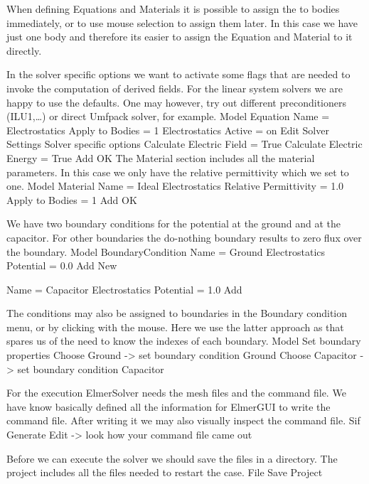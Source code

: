 When defining Equations and Materials it is possible to assign the to bodies immediately, or to use mouse
selection to assign them later. In this case we have just one body and therefore its easier to assign 
the Equation and Material to it directly.

In the solver specific options we want to activate some flags that are needed to invoke the 
computation of derived fields. 
For the linear system solvers we are happy to use the defaults. One may however, try out different
preconditioners (ILU1,\ldots) or direct Umfpack solver, for example.
\ttbegin
Model
  Equation
    Name = Electrostatics
    Apply to Bodies = 1
    Electrostatics
      Active = on
      Edit Solver Settings
        Solver specific options
          Calculate Electric Field = True
          Calculate Electric Energy = True
    Add 
    OK
\ttend        
The Material section includes all the material parameters.
In this case we only have the relative permittivity which we set to one.
\ttbegin
Model
  Material
    Name = Ideal
    Electrostatics
      Relative Permittivity = 1.0
    Apply to Bodies = 1 
    Add
    OK
\ttend

We have two boundary conditions for the potential at the ground and at the capacitor. For other boundaries
the do-nothing boundary results to zero flux over the boundary.
\ttbegin
Model
  BoundaryCondition
    Name = Ground
    Electrostatics
      Potential = 0.0
    Add
    New

    Name = Capacitor
    Electrostatics
      Potential = 1.0
    Add
\ttend   

The conditions may also be assigned to boundaries in the Boundary condition menu, or 
by clicking with the mouse. Here we use the latter approach as that spares us of the 
need to know the indexes of each boundary.
\ttbegin
Model
  Set boundary properties
    Choose Ground -> set boundary condition Ground
    Choose Capacitor -> set boundary condition Capacitor
\ttend


For the execution 
ElmerSolver needs the mesh files and the command file. We have know basically defined
all the information for ElmerGUI to write the command file. After writing it we may also visually 
inspect the command file.
\ttbegin
Sif 
  Generate
  Edit -> look how your command file came out  
\ttend

Before we can execute the solver we should save the files in a directory. The project includes
all the files needed to restart the case.
\ttbegin
File 
  Save Project
\ttend

